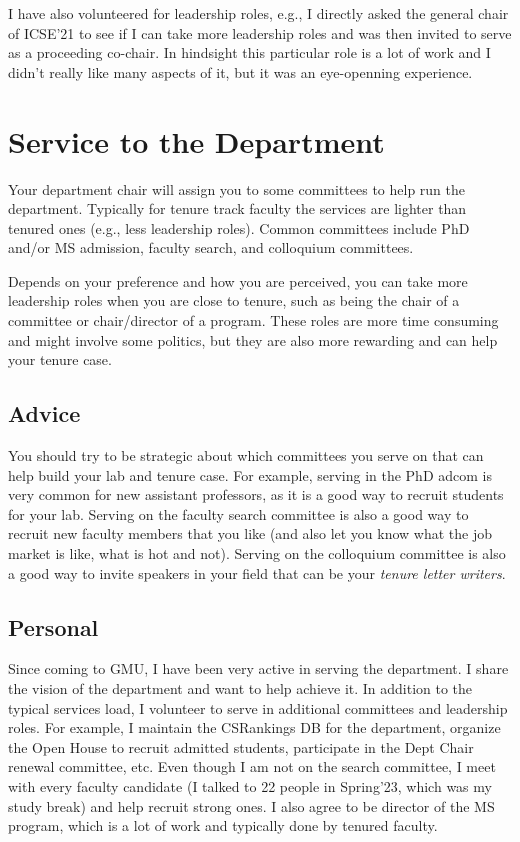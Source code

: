 \documentclass[oneside,11pt,dvipsnames]{book}
\begin{document}
I have also volunteered for leadership roles, e.g., I directly asked the general chair of ICSE'21 to see if I can take more leadership roles and was then invited to serve as a proceeding co-chair. In hindsight this particular role is a lot of work and I didn't really like many aspects of it, but it was an eye-openning experience.



\section{Service to the Department}
Your department chair will assign you to some committees to help run the department.  Typically for tenure track faculty the services are lighter than tenured ones (e.g., less leadership roles). Common committees include PhD and/or MS admission, faculty search, and colloquium committees.

Depends on your preference and how you are perceived, you can take more leadership roles when you are close to tenure, such as being the chair of a committee or chair/director of a program.  These roles are more time consuming and might involve some politics, but they are also more rewarding and can help your tenure case.

\subsection{Advice} You should try to be strategic about which committees you serve on that can help build your lab and tenure case. For example, serving in the PhD adcom is very common for new assistant professors, as it is a good way to recruit students for your lab. Serving on the faculty search committee is also a good way to recruit new faculty members that you like (and also let you know what the job market is like, what is hot and not). Serving on the colloquium committee is also a good way to invite speakers in your field that can be your \emph{tenure letter writers}.

\subsection{Personal} Since coming to GMU, I have been very active in serving the department.  I share the vision of the department and want to help achieve it. In addition to the typical services load, I volunteer to serve in additional committees and leadership roles. For example, I maintain the CSRankings DB for the department, organize the Open House to recruit admitted students, participate in the Dept Chair renewal committee, etc.
Even though I am not on the search committee, I meet with every faculty candidate (I talked to 22 people in Spring'23, which was my study break) and help recruit strong ones. I also agree to be director of the MS program, which is a lot of work and typically done by tenured faculty.
\end{document}
